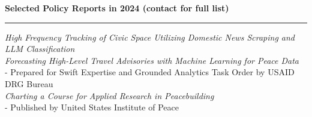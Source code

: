 \documentclass[11pt]{article}
\begin{document}
\textbf{\large Selected Policy Reports in 2024 (contact for full list)}\\
\rule[3mm]{\textwidth}{.2pt}\vspace{-5pt}
{\sl High Frequency Tracking of Civic Space Utilizing Domestic News Scraping and LLM Classification}\\
{\sl Forecasting High-Level Travel Advisories with Machine Learning for Peace Data}\\
- Prepared for Swift Expertise and Grounded Analytics Task Order by USAID DRG Bureau\\
{\sl Charting a Course for Applied Research in Peacebuilding}\\
- Published by United States Institute of Peace






% 
% 
% 
% 
% 
% 
% 
\end{document}
